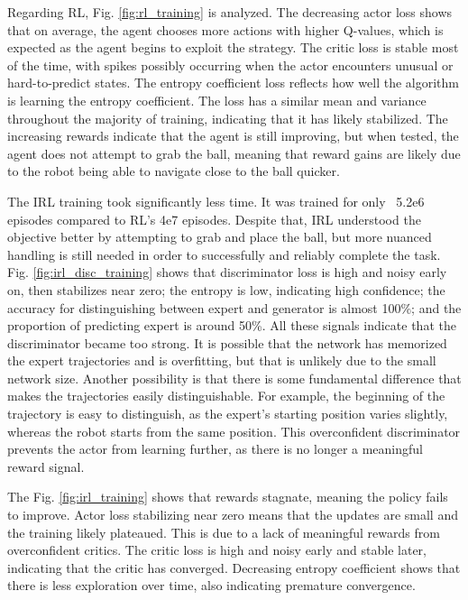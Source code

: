 \bigskip \noindent
Regarding RL, Fig. \ref{fig:rl_training} is analyzed. The decreasing actor loss shows that on average, the agent chooses more actions with higher Q-values, which is expected as the agent begins to exploit the strategy. The critic loss is stable most of the time, with spikes possibly occurring when the actor encounters unusual or hard-to-predict states. The entropy coefficient loss reflects how well the algorithm is learning the entropy coefficient. The loss has a similar mean and variance throughout the majority of training, indicating that it has likely stabilized. The increasing rewards indicate that the agent is still improving, but when tested, the agent does not attempt to grab the ball, meaning that reward gains are likely due to the robot being able to navigate close to the ball quicker.

\bigskip \noindent
The IRL training took significantly less time. It was trained for only ~5.2e6 episodes compared to RL's 4e7 episodes. Despite that, IRL understood the objective better by attempting to grab and place the ball, but more nuanced handling is still needed in order to successfully and reliably complete the task. Fig. \ref{fig:irl_disc_training} shows that discriminator loss is high and noisy early on, then stabilizes near zero; the entropy is low, indicating high confidence; the accuracy for distinguishing between expert and generator is almost 100\%; and the proportion of predicting expert is around 50\%. All these signals indicate that the discriminator became too strong. It is possible that the network has memorized the expert trajectories and is overfitting, but that is unlikely due to the small network size. Another possibility is that there is some fundamental difference that makes the trajectories easily distinguishable. For example, the beginning of the trajectory is easy to distinguish, as the expert's starting position varies slightly, whereas the robot starts from the same position. This overconfident discriminator prevents the actor from learning further, as there is no longer a meaningful reward signal.

\bigskip \noindent
The Fig. \ref{fig:irl_training} shows that rewards stagnate, meaning the policy fails to improve. Actor loss stabilizing near zero means that the updates are small and the training likely plateaued. This is due to a lack of meaningful rewards from overconfident critics. The critic loss is high and noisy early and stable later, indicating that the critic has converged. Decreasing entropy coefficient shows that there is less exploration over time, also indicating premature convergence.